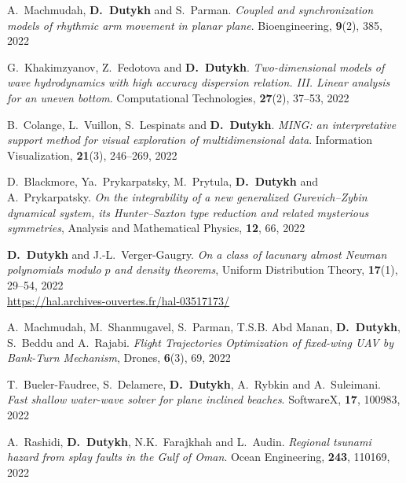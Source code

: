 \documentclass[final, a4paper, oneside, 12pt]{article}
\numberwithin{equation}{section}
\begin{document}
\begin{etaremune}
  
  \item A.~Machmudah, \textbf{D.~Dutykh} and S.~Parman. \textit{Coupled and synchronization models of rhythmic arm movement in planar plane}. Bioengineering, \textbf{9}(2), 385, 2022 %
  
  \item G.~Khakimzyanov, Z.~Fedotova and \textbf{D.~Dutykh}. \textit{Two-dimensional models of wave hydrodynamics with high accuracy dispersion relation. III. Linear analysis for an uneven bottom}. Computational Technologies, \textbf{27}(2), 37--53, 2022 %
  
  \item B.~Colange, L.~Vuillon, S.~Lespinats and \textbf{D.~Dutykh}. \textit{MING: an interpretative support method for visual exploration of multidimensional data}. Information Visualization, \textbf{21}(3), 246--269, 2022 %
  
  \item D.~Blackmore, Ya.~Prykarpatsky, M.~Prytula, \textbf{D.~Dutykh} and A.~Prykarpatsky. \textit{On the integrability of a new generalized Gurevich--Zybin dynamical system, its Hunter--Saxton type reduction and related mysterious symmetries}, Analysis and Mathematical Physics, \textbf{12}, 66, 2022 %
  
  \item \textbf{D.~Dutykh} and J.-L.~Verger-Gaugry. \textit{On a class of lacunary almost Newman polynomials modulo $p$ and density theorems}, Uniform Distribution Theory, \textbf{17}(1), 29--54, 2022 \\ %
  \url{https://hal.archives-ouvertes.fr/hal-03517173/}
  
  \item A.~Machmudah, M.~Shanmugavel, S.~Parman, T.S.B. Abd Manan, \textbf{D.~Dutykh}, S.~Beddu and A.~Rajabi. \textit{Flight Trajectories Optimization of fixed-wing UAV by Bank-Turn Mechanism}, Drones, \textbf{6}(3), 69, 2022 %
  
  \item T.~Bueler-Faudree, S.~Delamere, \textbf{D.~Dutykh}, A.~Rybkin and A.~Suleimani. \textit{Fast shallow water-wave solver for plane inclined beaches}. SoftwareX, \textbf{17}, 100983, 2022 %
  
  \item A.~Rashidi, \textbf{D.~Dutykh}, N.K.~Farajkhah and L.~Audin. \textit{Regional tsunami hazard from splay faults in the Gulf of Oman}. Ocean Engineering, \textbf{243}, 110169, 2022 %


\end{etaremune}
\end{document}
